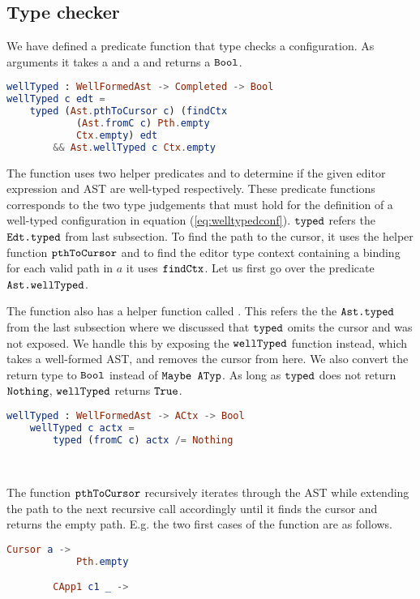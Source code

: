 \subsection{Type checker}

We have defined a predicate function  that type checks a
configuration. As arguments it takes a  and a  and returns a $\texttt{Bool}$.
\begin{lstlisting}[language=elm,%
                   gobble=0,%
                   ]
wellTyped : WellFormedAst -> Completed -> Bool
wellTyped c edt =
    typed (Ast.pthToCursor c) (findCtx
            (Ast.fromC c) Pth.empty
            Ctx.empty) edt
        && Ast.wellTyped c Ctx.empty
\end{lstlisting}

The function uses two helper predicates  and  to
determine if the given editor expression and AST are well-typed respectively.
These predicate functions corresponds to the two type judgements that must hold
for the definition of a well-typed configuration in equation
(\ref{eq:welltypedconf}). $\texttt{typed}$ refers the $\texttt{Edt.typed}$ from last
subsection. To find the path to the cursor, it uses the helper function
$\texttt{pthToCursor}$ and to find the editor type context containing a binding
for each valid path in $a$ it uses $\texttt{findCtx}$. Let us first go over the
predicate $\texttt{Ast.wellTyped}$.

The  function also has a helper function called .
This refers the the $\texttt{Ast.typed}$ from the last subsection where we
discussed that $\texttt{typed}$ omits the cursor and was not exposed. We handle
this by exposing the $\texttt{wellTyped}$ function instead, which takes a
well-formed AST, and removes the cursor from here. We also convert the return
type to $\texttt{Bool}$ instead of $\texttt{Maybe ATyp}$. As long as $\texttt{typed}$
does not return $\texttt{Nothing}$, $\texttt{wellTyped}$ returns $\texttt{True}$.
\begin{lstlisting}[language=elm,%
                   gobble=4,%
                   ]
    wellTyped : WellFormedAst -> ACtx -> Bool
    wellTyped c actx =
        typed (fromC c) actx /= Nothing
\end{lstlisting}
~

The function $\texttt{pthToCursor}$ recursively iterates through the AST while
extending the path to the next recursive call accordingly until it finds the
cursor and returns the empty path. E.g. the two first cases of the function are
as follows.
\begin{lstlisting}[language=elm,%
                   gobble=8,%
                   ]
        Cursor a ->
            Pth.empty

        CApp1 c1 _ ->
\end{lstlisting}
~

